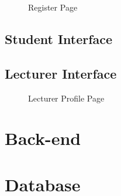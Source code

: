 \documentclass[a4paper,12pt]{article}
\numberwithin{equation}{section} %
\numberwithin{figure}{section}
\begin{document}
\begin{figure}[H]
\centering
{}
\caption{Register Page}
\label{register}
\end{figure}

\subsection{Student Interface}

\subsection{Lecturer Interface}
\begin{figure}[H]
\centering
{}
\caption{Lecturer Profile Page}
\label{lecturerProfile}
\end{figure}

\section{Back-end}

\section{Database}
\end{document}
